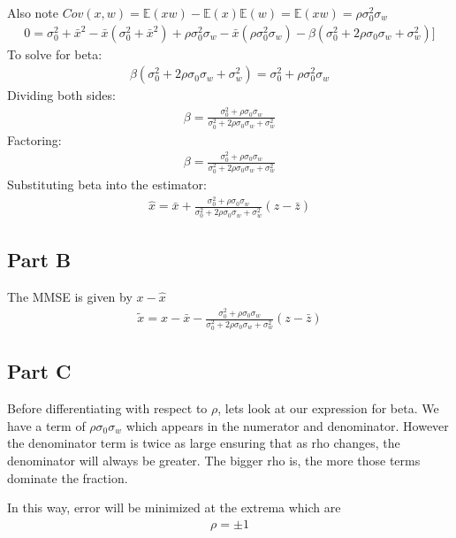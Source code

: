 \documentclass{article}
\begin{document}
Also note $Cov(x,w)=\mathbb{E}(xw) - \mathbb{E}(x)\mathbb{E}(w) = \mathbb{E}(xw) = \rho\sigma_0^2\sigma_w$
\begin{align*}
0=\sigma_0^2+\bar{x}^2 - \bar{x}(\sigma_0^2+\bar{x}^2) + \rho\sigma_0^2\sigma_w - \bar{x}(\rho\sigma_0^2\sigma_w) - \beta (\sigma^2_0+ 2\rho\sigma_0\sigma_w + \sigma^2_w)]
\end{align*}
To solve for beta:
\begin{align*}
\beta (\sigma^2_0+ 2\rho\sigma_0\sigma_w + \sigma^2_w) =\sigma_0^2 + \rho\sigma_0^2\sigma_w
\end{align*}
Dividing both sides:
\begin{align*}
\beta = \frac{ \sigma_0^2 + \rho\sigma_0\sigma_w}{\sigma^2_0+ 2\rho\sigma_0\sigma_w + \sigma^2_w}
\end{align*}
Factoring:
\begin{align*}
\beta = \frac{ \sigma_0^2 + \rho\sigma_0\sigma_w}{\sigma^2_0+ 2\rho\sigma_0\sigma_w + \sigma^2_w}
\end{align*}
Substituting beta into the estimator:
\begin{align*}
\boxed{ \hat{x} = \bar{x} + \frac{ \sigma_0^2 + \rho\sigma_0\sigma_w}{\sigma^2_0+ 2\rho\sigma_0\sigma_w + \sigma^2_w} (z-\bar{z}) }
\end{align*}
\subsection*{Part B}
The MMSE is given by $x-\hat{x}$
\begin{align*}
\boxed{ \tilde{x} = x - \bar{x} - \frac{ \sigma_0^2 + \rho\sigma_0\sigma_w}{\sigma^2_0+ 2\rho\sigma_0\sigma_w + \sigma^2_w} (z-\bar{z}) }
\end{align*}

\subsection*{Part C}
Before differentiating with respect to $\rho$, lets look at our expression for beta. We have a term of $\rho\sigma_0 \sigma_w$ which appears in the numerator and denominator. However the denominator term is twice as large ensuring that as rho changes, the denominator will always be greater. The bigger rho is, the more those terms dominate the fraction.

In this way, error will be minimized at the extrema which are
\begin{align*}
\rho = \pm 1
\end{align*}
\end{document}
